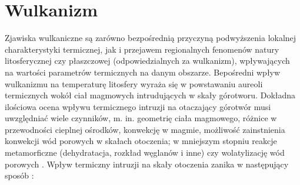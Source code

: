 \documentclass[11.5pt,twoside]{report}
\begin{document}
 
 

 

 
 
 \section{Wulkanizm}
 
 Zjawiska wulkaniczne są zarówno bezpośrednią przyczyną podwyższenia lokalnej charakterystyki termicznej, jak i przejawem regionalnych fenomenów natury litosferycznej czy płaszczowej (odpowiedzialnych za wulkanizm), wpływających na wartości parametrów termicznych na danym obszarze. Bepośredni wpływ wulkanizmu na temperaturę litosfery wyraża się w powstawaniu aureoli termicznych wokół ciał magmowych intrudujących w skały górotworu. Dokładna ilościowa ocena wpływu termicznego intruzji na otaczający górotwór musi uwzględniać wiele czynników, m. in. geometrię ciała magmowego, różnice w przewodności cieplnej ośrodków, konwekcję w magmie, możliwość zainstnienia konwekcji wód porowych w skałach otoczenia; w mniejszym stopniu reakcje metamorficzne (dehydratacja, rozkład węglanów i inne) czy wolatylizację wód porowych \parencite{Annen.2017}. Wpływ termiczny intruzji na skały otoczenia zanika w następujący sposób \parencite{Majorowicz.1975}:
 
\end{document}
